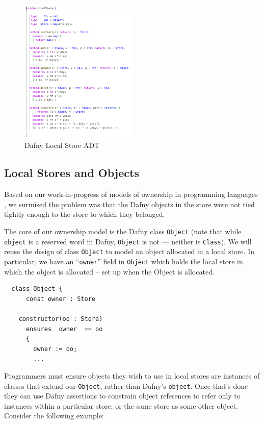 \begin{figure}[htb]
\centering
\includegraphics[width=0.5\textwidth]{LocalStoreDafny.pdf}
\caption{Dafny Local Store ADT}
\label{fig2}
\end{figure}




\subsection{Local Stores and Objects}

Based on our work-in-progress of models of ownership in
programming languages \cite{dafnydala-ftfjp2024}, we surmised the
problem was that the Dafny objects in the store were not tied tightly
enough to the store to which they belonged. 

The core of our ownership model is the Dafny class \lstinline+Object+
(note that while \lstinline+object+ is a reserved word in Dafny,
\lstinline+Object+ is not --- neither is \lstinline+Class+). We will
reuse the design of class \lstinline+Object+ to model an object
allocated in a local store. In particular, we have an
``\lstinline+owner+'' field in \lstinline+Object+ which holds the
local store in which the object is allocated -- set up when the Object
is allocated.

\begin{lstlisting}
  class Object {  
      const owner : Store
 
    constructor(oo : Store) 
      ensures  owner  == oo
      { 
        owner := oo; 
        ...
\end{lstlisting}

Programmers must ensure objects they wish to use in local stores
are instances of classes that extend our \lstinline+Object+,
rather than Dafny's \lstinline+object+. Once that's done
they can use Dafny assertions to constrain object references
to refer only to instances within a particular store, or the same
store as some other object.  Consider the following example:


